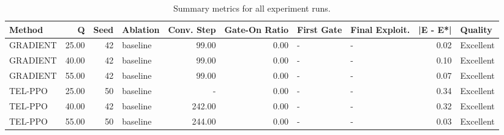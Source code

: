 \begin{table}[htbp]
\centering
\caption{Summary metrics for all experiment runs.}
\label{tab:summary_metrics}
\begin{tabular}{lrrlrrllrl}
\toprule
Method & Q & Seed & Ablation & Conv. Step & Gate-On Ratio & First Gate & Final Exploit. & |E - E*| & Quality \\
\midrule
GRADIENT & 25.00 & 42 & baseline & 99.00 & 0.00 & - & - & 0.02 & Excellent \\
GRADIENT & 40.00 & 42 & baseline & 99.00 & 0.00 & - & - & 0.10 & Excellent \\
GRADIENT & 55.00 & 42 & baseline & 99.00 & 0.00 & - & - & 0.07 & Excellent \\
TEL-PPO & 25.00 & 50 & baseline & - & 0.00 & - & - & 0.34 & Excellent \\
TEL-PPO & 40.00 & 42 & baseline & 242.00 & 0.00 & - & - & 0.32 & Excellent \\
TEL-PPO & 55.00 & 50 & baseline & 244.00 & 0.00 & - & - & 0.03 & Excellent \\
\bottomrule
\end{tabular}

\end{table}
